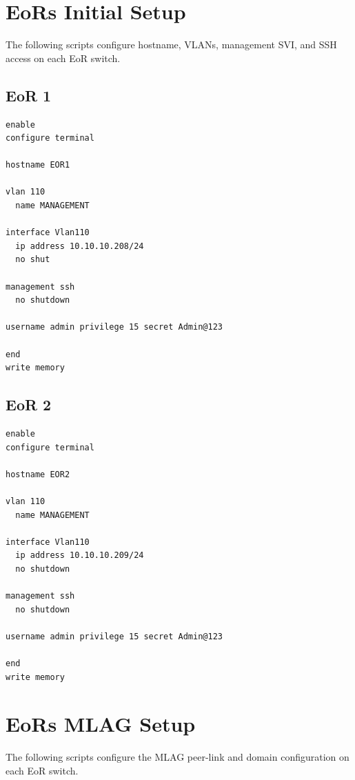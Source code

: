 \section{EoRs Initial Setup}

The following scripts configure hostname, VLANs, management SVI, and SSH access on each EoR switch.

\subsection{EoR 1}
\begin{lstlisting}[caption={EoR 1: initial management and VLAN setup.},basicstyle=\ttfamily\footnotesize,breaklines=true]
enable
configure terminal

hostname EOR1

vlan 110
  name MANAGEMENT

interface Vlan110
  ip address 10.10.10.208/24
  no shut

management ssh
  no shutdown

username admin privilege 15 secret Admin@123

end
write memory
\end{lstlisting}

\subsection{EoR 2}
\begin{lstlisting}[caption={EoR 2: initial management and VLAN setup.},basicstyle=\ttfamily\footnotesize,breaklines=true]
enable
configure terminal

hostname EOR2

vlan 110
  name MANAGEMENT
 
interface Vlan110
  ip address 10.10.10.209/24
  no shutdown

management ssh
  no shutdown

username admin privilege 15 secret Admin@123

end
write memory
\end{lstlisting}

\section{EoRs MLAG Setup}

The following scripts configure the MLAG peer-link and domain configuration on each EoR switch.

